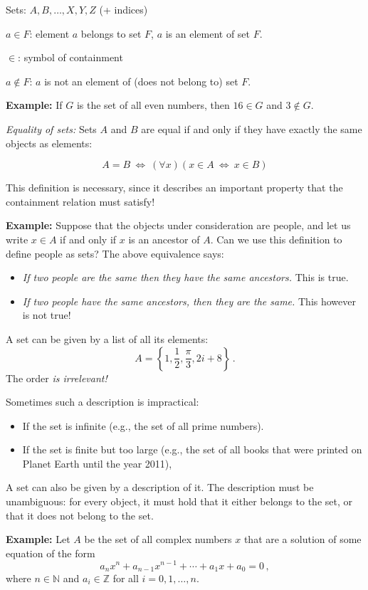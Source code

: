 \documentclass[11pt,paper=b5,footinclude,headinclude]{scrbook} %
\def\cee {{~\Leftrightarrow~}}
\theoremstyle{remark}
\theoremstyle{definition} %
\begin{document}
Sets: $A,B,\ldots, X,Y,Z$ (+ indices)

$a\in F$: element $a$ belongs to set $F$, $a$ is an element of set $F$.

$\in$: symbol of containment

$a\not\in F$: $a$ is not an element of (does not belong to) set $F$.

\textbf{ Example:}
If $G$ is the set of all even numbers, then $16\in G$ and $3\not\in G$.


\medskip
{\em Equality of sets:} Sets $A$ and $B$ are equal if and only if they have exactly the same objects as elements:

$$A = B \cee (\forall x) (x\in A\cee x\in B)$$

\medskip
This definition is necessary, since it describes an important property that the containment relation must satisfy!

\medskip

\textbf{ Example:} Suppose that the objects under consideration are people, and
let us write $x\in A$ if and only if $x$ is an ancestor of  $A$.
Can we use this definition to define people as sets?
The above equivalence says:
\begin{itemize}
  \item {\em If two people are the same then they have the same ancestors.} This is true.
  \item {\em If two people have the same ancestors, then they are the same.} This however is not true!
\end{itemize}

\bigskip
A set can be given by a list of all its elements:
$$A = \left\{1,\frac{1}{2}, \frac{\pi}{3}, 2i+8\right\}\,.$$
The order {\em is irrelevant!}

\medskip
Sometimes such a description is impractical:
\begin{itemize}
  \item If the set is infinite (e.g., the set of all prime numbers).
  \item If the set is finite but too large (e.g., the set of all books that were printed on Planet Earth until the year 2011),
\end{itemize}

\medskip
A set can also be given by a description of it. The description must be unambiguous:
for every object, it must hold that it either belongs to the set, or that it does not belong to the set.

\medskip
\textbf{ Example:} Let $A$ be the set of all complex numbers  $x$ that are a solution of some equation of the form
$$a_nx^n+a_{n-1}x^{n-1}+\cdots+a_1x+a_0 = 0\,,$$
where $n\in \mathbb{N}$ and $a_i\in \mathbb{Z}$ for all $i= 0,1,\ldots, n$.
\end{document}
